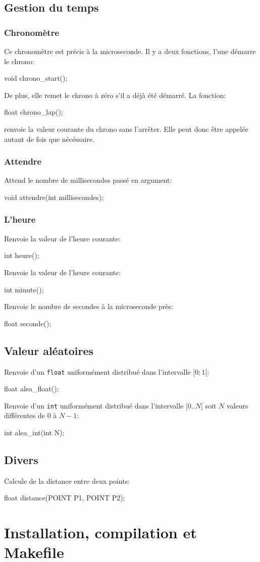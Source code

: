 \documentclass{report}
\newcommand\code[1]{
\begin{mdframed}[linecolor=purple,backgroundcolor=blue!10]
{\tt
#1
}
\end{mdframed}
}
\begin{document}
\section{Gestion du temps}

\subsection{Chronomètre}
Ce chronomètre est précis à la microseconde.
Il y a deux fonctions, l'une démarre le chrono:
\code{
void chrono\_start();
}
De plus, elle remet le chrono à zéro s'il a déjà été démarré.
La fonction:
\code{
float chrono\_lap();
}
renvoie la valeur courante du chrono sans l'arrêter.
Elle peut donc être appelée autant de fois que nécéssaire.

\subsection{Attendre}
Attend le nombre de millisecondes passé en argument:
\code{
void attendre(int millisecondes);
}

\subsection{L'heure}
Renvoie la valeur de l'heure courante:
\code{
int heure();
}

Renvoie la valeur de l'heure courante:
\code{
int minute();
}

Renvoie le nombre de secondes à la microseconde près:
\code{
float seconde();
}

\section{Valeur aléatoires}
Renvoie d'un \texttt{float} uniformément distribué dans l'intervalle $[0;1[$:
\code{
float alea\_float();
}

Renvoie d'un \texttt{int} uniformément distribué dans l'intervalle $[0..N[$
soit $N$ valeurs différentes de 0 à $N-1$:
\code{
int alea\_int(int N);
}

\section{Divers}
Calcule de la distance entre deux points:
\code{
float distance(POINT P1, POINT P2);
}

\chapter{Installation, compilation et Makefile}
\end{document}
